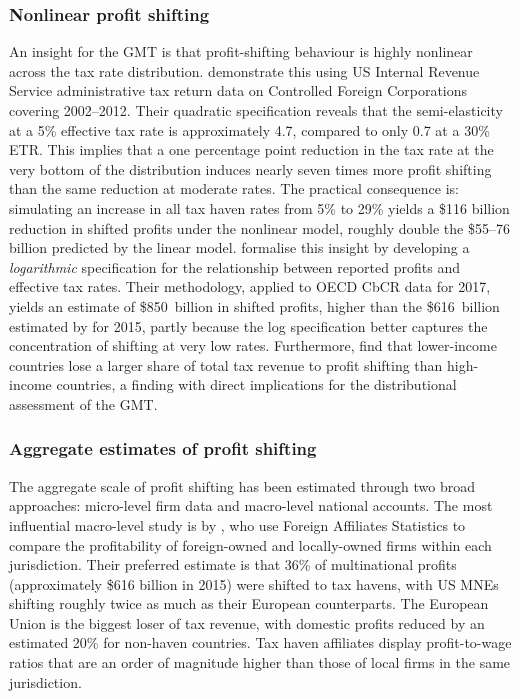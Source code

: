 \documentclass[11pt,a4paper]{article}
\begin{document}
\subsubsection{Nonlinear profit shifting}

An insight for the GMT is that profit-shifting behaviour is highly nonlinear across the tax rate distribution. \citet{dowd2017} demonstrate this using US Internal Revenue Service administrative tax return data on Controlled Foreign Corporations covering 2002--2012. Their quadratic specification reveals that the semi-elasticity at a 5\% effective tax rate is approximately 4.7, compared to only 0.7 at a 30\% ETR. This implies that a one percentage point reduction in the tax rate at the very bottom of the distribution induces nearly seven times more profit shifting than the same reduction at moderate rates. The practical consequence is: simulating an increase in all tax haven rates from 5\% to 29\% yields a \$116 billion reduction in shifted profits under the nonlinear model, roughly double the \$55--76 billion predicted by the linear model. \citet{garcia-bernardo2024} formalise this insight by developing a \emph{logarithmic} specification for the relationship between reported profits and effective tax rates. Their methodology, applied to OECD CbCR data for 2017, yields an estimate of \$850~billion in shifted profits, higher than the \$616~billion estimated by \citet{torslov2023} for 2015, partly because the log specification better captures the concentration of shifting at very low rates. Furthermore, \citet{garcia-bernardo2024} find that lower-income countries lose a larger share of total tax revenue to profit shifting than high-income countries, a finding with direct implications for the distributional assessment of the GMT.

\subsubsection{Aggregate estimates of profit shifting}

The aggregate scale of profit shifting has been estimated through two broad approaches: micro-level firm data and macro-level national accounts. The most influential macro-level study is by \citet{torslov2023}, who use Foreign Affiliates Statistics to compare the profitability of foreign-owned and locally-owned firms within each jurisdiction. Their preferred estimate is that 36\% of multinational profits (approximately \$616 billion in 2015) were shifted to tax havens, with US MNEs shifting roughly twice as much as their European counterparts. The European Union is the biggest loser of tax revenue, with domestic profits reduced by an estimated 20\% for non-haven countries. Tax haven affiliates display profit-to-wage ratios that are an order of magnitude higher than those of local firms in the same jurisdiction.
\end{document}
